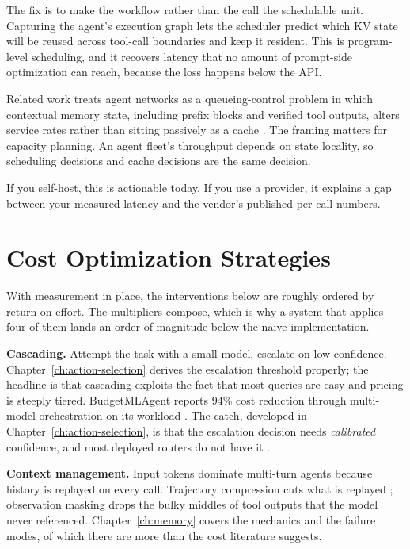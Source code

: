 The fix is to make the workflow rather than the call the schedulable unit.
Capturing the agent's execution graph lets the scheduler predict which KV state
will be reused across tool-call boundaries and keep it resident. This is
program-level scheduling, and it recovers latency that no amount of
prompt-side optimization can reach, because the loss happens below the API.

Related work treats agent networks as a queueing-control problem in which
contextual memory state, including prefix blocks and verified tool outputs,
alters service rates rather than sitting passively as a cache
\cite{backpressure2026}. The framing matters for capacity planning. An agent
fleet's throughput depends on state locality, so scheduling decisions and cache
decisions are the same decision.

If you self-host, this is actionable today. If you use a provider, it explains a
gap between your measured latency and the vendor's published per-call numbers.

\section{Cost Optimization Strategies}

With measurement in place, the interventions below are roughly ordered by return
on effort. The multipliers compose, which is why a system that applies four of
them lands an order of magnitude below the naive implementation.

\textbf{Cascading.} Attempt the task with a small model, escalate on low
confidence. Chapter~\ref{ch:action-selection} derives the escalation threshold
properly; the headline is that cascading exploits the fact that most queries are
easy and pricing is steeply tiered. BudgetMLAgent reports 94\% cost reduction
through multi-model orchestration on its workload \cite{budgetmlagent2024}. The
catch, developed in Chapter~\ref{ch:action-selection}, is that the escalation
decision needs \emph{calibrated} confidence, and most deployed routers do not
have it \cite{ucci2026}.

\textbf{Context management.} Input tokens dominate multi-turn agents because
history is replayed on every call. Trajectory compression cuts what is replayed
\cite{agentdiet2024}; observation masking drops the bulky middles of tool outputs
that the model never referenced. Chapter~\ref{ch:memory} covers the mechanics and
the failure modes, of which there are more than the cost literature suggests.

